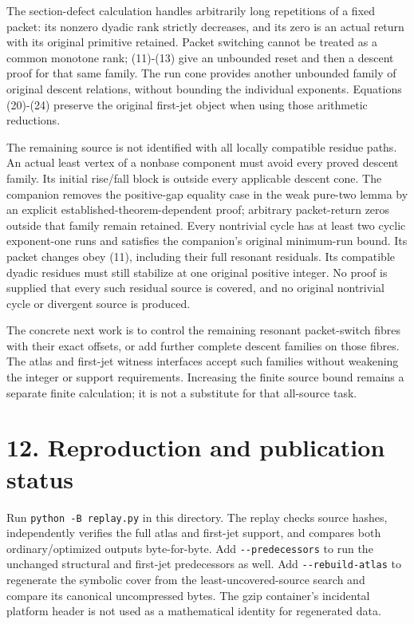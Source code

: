 The section-defect calculation handles arbitrarily long repetitions of a
fixed packet: its nonzero dyadic rank strictly decreases, and its zero
is an actual return with its original primitive retained. Packet
switching cannot be treated as a common monotone rank; (11)-(13) give an
unbounded reset and then a descent proof for that same family. The run
cone provides another unbounded family of original descent relations,
without bounding the individual exponents. Equations (20)-(24) preserve
the original first-jet object when using those arithmetic reductions.

The remaining source is not identified with all locally compatible
residue paths. An actual least vertex of a nonbase component must avoid
every proved descent family. Its initial rise/fall block is outside
every applicable descent cone. The companion removes the positive-gap
equality case in the weak pure-two lemma by an explicit
established-theorem-dependent proof; arbitrary packet-return zeros
outside that family remain retained. Every nontrivial cycle has at least
two cyclic exponent-one runs and satisfies the companion's original
minimum-run bound. Its packet changes obey (11), including their full
resonant residuals. Its compatible dyadic residues must still stabilize
at one original positive integer. No proof is supplied that every such
residual source is covered, and no original nontrivial cycle or
divergent source is produced.

The concrete next work is to control the remaining resonant
packet-switch fibres with their exact offsets, or add further complete
descent families on those fibres. The atlas and first-jet witness
interfaces accept such families without weakening the integer or support
requirements. Increasing the finite source bound remains a separate
finite calculation; it is not a substitute for that all-source task.

\section{12. Reproduction and publication status}

Run \nolinkurl{python -B replay.py} in this directory. The replay checks
source hashes, independently verifies the full atlas and first-jet
support, and compares both ordinary/optimized outputs byte-for-byte. Add
\nolinkurl{--predecessors} to run the unchanged structural and first-jet
predecessors as well. Add \nolinkurl{--rebuild-atlas} to regenerate the
symbolic cover from the least-uncovered-source search and compare its
canonical uncompressed bytes. The gzip container's incidental platform
header is not used as a mathematical identity for regenerated data.

